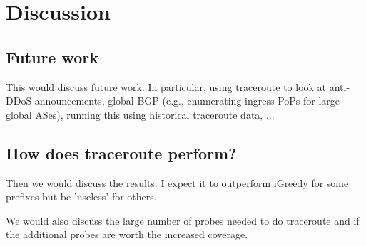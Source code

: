 
\section{Discussion}\label{discussion}
\subsection{Future work}
This would discuss future work.
In particular, using traceroute to look at anti-DDoS announcements, global BGP (e.g., enumerating ingress PoPs for large global ASes), running this using historical traceroute data, ...

\subsection{How does traceroute perform?}
Then we would discuss the results. I expect it to outperform iGreedy for some prefixes but be 'useless' for others.

We would also discuss the large number of probes needed to do traceroute and if the additional probes are worth the increased coverage.